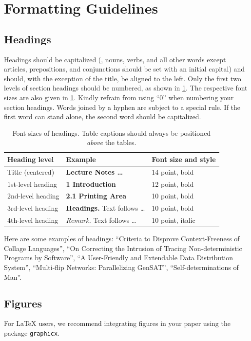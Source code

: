 \documentclass[runningheads]{llncs}
\begin{document}
\section{Formatting Guidelines}

\subsection{Headings}
Headings should be capitalized (\ie, nouns, verbs, and all other words except articles, prepositions, and conjunctions should be set with an initial capital) and should, with the exception of the title, be aligned to the left.
Only the first two levels of section headings should be numbered, as shown in \cref{tab:headings}.
The respective font sizes are also given in \cref{tab:headings}. 
Kindly refrain from using ``0'' when numbering your section headings.
Words joined by a hyphen are subject to a special rule. 
If the first word can stand alone, the second word should be capitalized.

\begin{table}[tb]
  \caption{Font sizes of headings. 
    Table captions should always be positioned \emph{above} the tables.
  }
  \label{tab:headings}
  \centering
  \begin{tabular}{@{}lll@{}}
    \toprule
    Heading level & Example & Font size and style\\
    \midrule
    Title (centered)  & {\Large\bf Lecture Notes \dots} & 14 point, bold\\
    1st-level heading & {\large\bf 1 Introduction} & 12 point, bold\\
    2nd-level heading & {\bf 2.1 Printing Area} & 10 point, bold\\
    3rd-level heading & {\bf Headings.} Text follows \dots & 10 point, bold\\
    4th-level heading & {\it Remark.} Text follows \dots & 10 point, italic\\
  \bottomrule
  \end{tabular}
\end{table}

Here are some examples of headings: 
``Criteria to Disprove Context-Freeness of Collage Languages'', ``On Correcting the Intrusion of Tracing Non-deterministic Programs by Software'', ``A User-Friendly and Extendable Data Distribution System'', ``Multi-flip Networks: Parallelizing GenSAT'', ``Self-determinations of Man''.


\subsection{Figures}
\label{sect:figures}
For \LaTeX{} users, we recommend integrating figures in your paper using the package \texttt{graphicx}.
\end{document}
